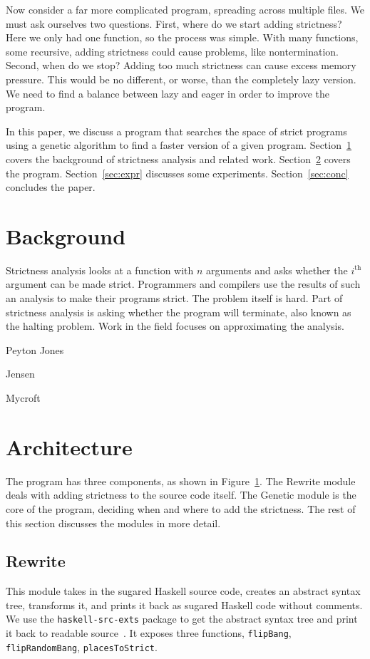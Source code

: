 \documentclass{sigplanconf}
\begin{document}
Now consider a far more complicated program, spreading across multiple files. We must ask ourselves two questions. First, where do we start adding strictness? Here we only had one function, so the process was simple. With many functions, some recursive, adding strictness could cause problems, like nontermination. Second, when do we stop? Adding too much strictness can cause excess memory pressure. This would be no different, or worse, than the completely lazy version. We need to find a balance between lazy and eager in order to improve the program.

In this paper, we discuss a program that searches the space of strict programs using a genetic algorithm to find a faster version of a given program. Section~\ref{sec:back} covers the background of strictness analysis and related work. Section~\ref{sec:arch} covers the program. Section~\ref{sec:expr} discusses some experiments. Section~\ref{sec:conc} concludes the paper.

\section{Background}\label{sec:back}
Strictness analysis looks at a function with $n$ arguments and asks whether the $i^{\text{th}}$ argument can be made strict. Programmers and compilers use the results of such an analysis to make their programs strict. The problem itself is hard. Part of strictness analysis is asking whether the program will terminate, also known as the halting problem. Work in the field focuses on approximating the analysis.

Peyton Jones\cite{pjones}

Jensen\cite{jensen}

Mycroft\cite{mycroft}

\section{Architecture}\label{sec:arch}
\begin{figure}
\label{fig:arch}
\end{figure}
The program has three components, as shown in Figure~\ref{fig:arch}. The Rewrite module deals with adding strictness to the source code itself. The Genetic module is the core of the program, deciding when and where to add the strictness. The rest of this section discusses the modules in more detail.
\subsection{Rewrite}
This module takes in the sugared Haskell source code, creates an abstract syntax tree, transforms it, and prints it back as sugared Haskell code without comments. We use the \lstinline!haskell-src-exts! package to get the abstract syntax tree and print it back to readable source~\cite{hsrcext}. It exposes three functions, \lstinline!flipBang!, \lstinline!flipRandomBang!, \lstinline!placesToStrict!.
\end{document}
